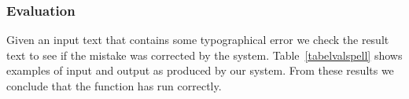 \subsubsection*{Evaluation}
Given an input text that contains some typographical error  we check the result text to see if the mistake was corrected by the system. Table~\ref{tabelvalspell} shows examples of input and output as produced by our system. From these results we conclude that the function has run correctly.\\ 
\begin{table}[H]
    \caption {Example result of evaluation}
    \label{tabelvalspell}
\end{table}


